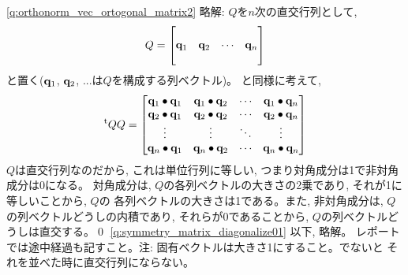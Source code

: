 \ref{q:orthonorm_vec_ortogonal_matrix2} 略解: $Q$を$n$次の直交行列として, 
\begin{eqnarray}Q=
\begin{bmatrix}
          &           &         &         \\
{\bf q}_1 & {\bf q}_2 & \cdots & {\bf q}_n\\
          &           &        &          \\
\end{bmatrix}
\end{eqnarray}
と置く(${\bf q}_1$, ${\bf q}_2$, ...は$Q$を構成する列ベクトル)。
と同様に考えて, 
\begin{eqnarray*}
^{\text t}QQ
=\begin{bmatrix}
{\bf q}_1\bullet{\bf q}_1 & {\bf q}_1\bullet{\bf q}_2 & \cdots & {\bf q}_1\bullet{\bf q}_n\\
{\bf q}_2\bullet{\bf q}_1 & {\bf q}_2\bullet{\bf q}_2 & \cdots & {\bf q}_2\bullet{\bf q}_n\\
\vdots & \vdots & \ddots & \vdots\\
{\bf q}_n\bullet{\bf q}_1 & {\bf q}_n\bullet{\bf q}_2 & \cdots & {\bf q}_n\bullet{\bf q}_n\\
\end{bmatrix}
\end{eqnarray*}
$Q$は直交行列なのだから, これは単位行列に等しい, つまり対角成分は1で非対角成分は0になる。
対角成分は, $Q$の各列ベクトルの大きさの2乗であり, それが1に等しいことから, $Q$の
各列ベクトルの大きさは1である。また, 非対角成分は, $Q$の列ベクトルどうしの内積であり, 
それらが0であることから, $Q$の列ベクトルどうしは直交する。\qed
\mv
%
%
%
\ref{q:symmetry_matrix_diagonalize01} 以下, 略解。
レポートでは途中経過も記すこと。注: 固有ベクトルは大きさ1にすること。でないと
それを並べた時に直交行列にならない。
